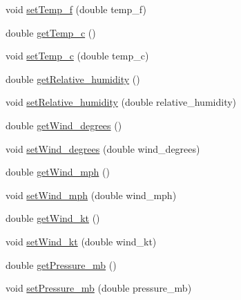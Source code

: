 \begin{DoxyCompactItemize}
void \hyperlink{classgov_1_1fnal_1_1ppd_1_1dd_1_1testing_1_1news_1_1current__observation_af401eba2e06d416f657dd55d2157ef29}{set\-Temp\-\_\-f} (double temp\-\_\-f)
\item 
double \hyperlink{classgov_1_1fnal_1_1ppd_1_1dd_1_1testing_1_1news_1_1current__observation_a5960524f7c8dbd27ab1b988597f89a65}{get\-Temp\-\_\-c} ()
\item 
void \hyperlink{classgov_1_1fnal_1_1ppd_1_1dd_1_1testing_1_1news_1_1current__observation_a6e8b1bcfe67adaec532dc364d4628b74}{set\-Temp\-\_\-c} (double temp\-\_\-c)
\item 
double \hyperlink{classgov_1_1fnal_1_1ppd_1_1dd_1_1testing_1_1news_1_1current__observation_a9ed0757da9fe9a69a3132d68ce7a8403}{get\-Relative\-\_\-humidity} ()
\item 
void \hyperlink{classgov_1_1fnal_1_1ppd_1_1dd_1_1testing_1_1news_1_1current__observation_aad58f992c94deb4a2a0ae2c278ad4bce}{set\-Relative\-\_\-humidity} (double relative\-\_\-humidity)
\item 
double \hyperlink{classgov_1_1fnal_1_1ppd_1_1dd_1_1testing_1_1news_1_1current__observation_ad7aaa6982c61394bde1a60d903a6ddb7}{get\-Wind\-\_\-degrees} ()
\item 
void \hyperlink{classgov_1_1fnal_1_1ppd_1_1dd_1_1testing_1_1news_1_1current__observation_a5900bfb9b12c5d75ad981bafe663967e}{set\-Wind\-\_\-degrees} (double wind\-\_\-degrees)
\item 
double \hyperlink{classgov_1_1fnal_1_1ppd_1_1dd_1_1testing_1_1news_1_1current__observation_a1b5eea829a28bd5e81bb8eda0b1238cb}{get\-Wind\-\_\-mph} ()
\item 
void \hyperlink{classgov_1_1fnal_1_1ppd_1_1dd_1_1testing_1_1news_1_1current__observation_a111ba6c0ab6eb4b8f463a42727e11a43}{set\-Wind\-\_\-mph} (double wind\-\_\-mph)
\item 
double \hyperlink{classgov_1_1fnal_1_1ppd_1_1dd_1_1testing_1_1news_1_1current__observation_ae80ee801306c233a34d3f32dca47ab7b}{get\-Wind\-\_\-kt} ()
\item 
void \hyperlink{classgov_1_1fnal_1_1ppd_1_1dd_1_1testing_1_1news_1_1current__observation_a64f982b7a01489558bdc8f3780899b7c}{set\-Wind\-\_\-kt} (double wind\-\_\-kt)
\item 
double \hyperlink{classgov_1_1fnal_1_1ppd_1_1dd_1_1testing_1_1news_1_1current__observation_a7fee3b838ef21149854975f87174ec3d}{get\-Pressure\-\_\-mb} ()
\item 
void \hyperlink{classgov_1_1fnal_1_1ppd_1_1dd_1_1testing_1_1news_1_1current__observation_a9a3dc870187072ea35d82d0e0cc97e3d}{set\-Pressure\-\_\-mb} (double pressure\-\_\-mb)

\end{DoxyCompactItemize}
